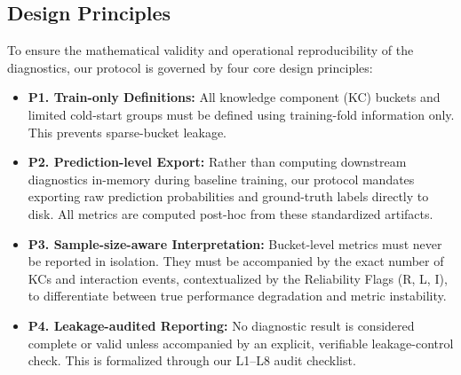 \subsection{Design Principles}
\label{sec:principles}
To ensure the mathematical validity and operational reproducibility of the diagnostics, our protocol is governed by four core design principles:
\begin{itemize}
    \item \textbf{P1. Train-only Definitions:} All knowledge component (KC) buckets and limited cold-start groups must be defined using training-fold information only. This prevents sparse-bucket leakage.
    \item \textbf{P2. Prediction-level Export:} Rather than computing downstream diagnostics in-memory during baseline training, our protocol mandates exporting raw prediction probabilities and ground-truth labels directly to disk. All metrics are computed post-hoc from these standardized artifacts.
    \item \textbf{P3. Sample-size-aware Interpretation:} Bucket-level metrics must never be reported in isolation. They must be accompanied by the exact number of KCs and interaction events, contextualized by the Reliability Flags (R, L, I), to differentiate between true performance degradation and metric instability.
    \item \textbf{P4. Leakage-audited Reporting:} No diagnostic result is considered complete or valid unless accompanied by an explicit, verifiable leakage-control check. This is formalized through our L1--L8 audit checklist.
\end{itemize}
